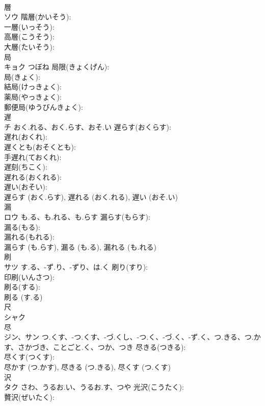 \documentclass[8pt]{extreport}
\begin{document}
\begin{CJK}{UTF8}{min}
\\	層			
\\	ソウ		階層(かいそう): 
\\	一層(いっそう): 
\\	高層(こうそう): 
\\	大層(たいそう): 
\\	局			
\\	キョク	つぼね	局限(きょくげん): 
\\	局(きょく): 
\\	結局(けっきょく): 
\\	薬局(やっきょく): 
\\	郵便局(ゆうびんきょく): 
\\	遅			
\\	チ	おく.れる、おく.らす、おそ.い	遅らす(おくらす): 
\\	遅れ(おくれ): 
\\	遅くとも(おそくとも): 
\\	手遅れ(ておくれ): 
\\	遅刻(ちこく): 
\\	遅れる(おくれる): 
\\	遅い(おそい): 
\\	遅らす (おく.らす), 遅れる (おく.れる), 遅い (おそ.い)
\\	漏			
\\	ロウ	も.る、も.れる、も.らす	漏らす(もらす): 
\\	漏る(もる): 
\\	漏れる(もれる): 
\\	漏らす (も.らす), 漏る (も.る), 漏れる (も.れる)
\\	刷			
\\	サツ	す.る、-ず.り、-ずり、は.く	刷り(すり): 
\\	印刷(いんさつ): 
\\	刷る(する): 
\\	刷る (す.る)
\\	尺			
\\	シャク			
\\	尽			
\\	ジン、サン	つ.くす、-つ.くす、-づ.くし、-つ.く、-づ.く、-ず.く、つ.きる、つ.かす、さかづき、ことごと.く、つか、つき	尽きる(つきる): 
\\	尽くす(つくす): 
\\	尽かす (つ.かす), 尽きる (つ.きる), 尽くす (つ.くす)
\\	沢			
\\	タク	さわ、うるお.い、うるお.す、つや	光沢(こうたく): 
\\	贅沢(ぜいたく): 

\end{CJK}
\end{document}
